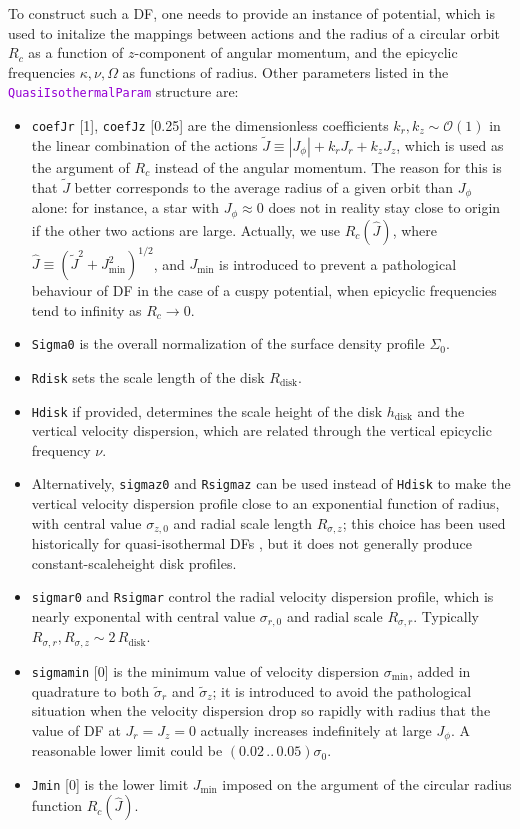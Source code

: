 \documentclass[12pt]{article}
\newcommand{\ttt}[1]{\textcolor{darkviolet}{\texttt{#1}}}
\newcommand{\ppp}[1]{\textcolor{darkolive} {\texttt{#1}}}
\begin{document}
To construct such a DF, one needs to provide an instance of potential, which is used to initalize the mappings between actions and the radius of a circular orbit $R_c$ as a function of $z$-component of angular momentum, and the epicyclic frequencies $\kappa, \nu, \Omega$ as functions of radius. Other parameters listed in the  \ttt{QuasiIsothermalParam} structure are:
\begin{itemize}
\item \ppp{coefJr} [1], \ppp{coefJz} [0.25] are the dimensionless coefficients $k_r,k_z\sim \mathcal{O}(1)$ in the linear combination of the actions $\tilde J \equiv |J_\phi| + k_r J_r + k_z J_z$, which is used as the argument of $R_c$ instead of the angular momentum. The reason for this is that $\tilde J$ better corresponds to the average radius of a given orbit than $J_\phi$ alone: for instance, a star with $J_\phi\approx 0$ does not in reality stay close to origin if the other two actions are large.
Actually, we use $R_c(\hat J)$, where $\hat J \equiv (\tilde J^2 + J_\mathrm{min}^2)^{1/2}$, and $J_\mathrm{min}$ is introduced to prevent a pathological behaviour of DF in the case of a cuspy potential, when epicyclic frequencies tend to infinity as $R_c \to 0$.
\item \ppp{Sigma0} is the overall normalization of the surface density profile $\Sigma_0$.
\item \ppp{Rdisk} sets the scale length of the disk $R_\mathrm{disk}$.
\item \ppp{Hdisk} if provided, determines the scale height of the disk $h_\mathrm{disk}$ and the vertical velocity dispersion, which are related through the vertical epicyclic frequency $\nu$. 
\item Alternatively, \ppp{sigmaz0} and \ppp{Rsigmaz} can be used instead of \ppp{Hdisk} to make the vertical velocity dispersion profile close to an exponential function of radius, with central value $\sigma_{z,0}$ and radial scale length $R_{\sigma,z}$; this choice has been used historically for quasi-isothermal DFs \cite{BinneyMcMillan2011,Bovy2015}, but it does not generally produce constant-scaleheight disk profiles.
\item \ppp{sigmar0} and \ppp{Rsigmar} control the radial velocity dispersion profile, which is nearly exponental with central value $\sigma_{r,0}$ and radial scale $R_{\sigma,r}$. Typically $R_{\sigma,r}, R_{\sigma,z} \sim 2\,R_\mathrm{disk}$.
\item \ppp{sigmamin} [0] is the minimum value of velocity dispersion $\sigma_\mathrm{min}$, added in quadrature to both $\tilde\sigma_r$ and $\tilde\sigma_z$; it is introduced to avoid the pathological situation when the velocity dispersion drop so rapidly with radius that the value of DF at $J_r=J_z=0$ actually increases indefinitely at large $J_\phi$. A reasonable lower limit could be $(0.02\, .. \, 0.05)\sigma_0$.
\item \ppp{Jmin} [0] is the lower limit $J_\mathrm{min}$ imposed on the argument of the circular radius function $R_c(\hat J)$.
\end{itemize}
\end{document}
